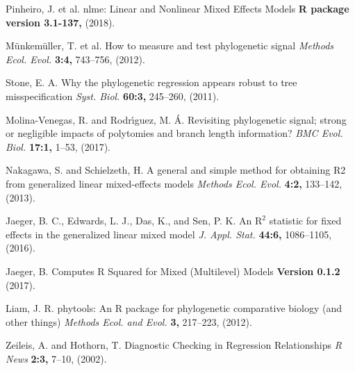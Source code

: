 \documentclass[twocolumn, linenumbers, superscriptaddress, nofootinbib]{revtex4-1}
\begin{document}
\begin{thebibliography}{50}
				Pinheiro, J. et al.
				nlme: Linear and Nonlinear Mixed Effects Models
				\textbf{R package version 3.1-137,}
				(2018).
			
				M{\"u}nkem{\"u}ller, T. et al.
				How to measure and test phylogenetic signal
				\textit{Methods Ecol. Evol.}
				\textbf{3:4,}
				743--756,
				(2012).
			
				Stone, E. A.
				Why the phylogenetic regression appears robust to tree misspecification
				\textit{Syst. Biol.}
				\textbf{60:3,}
				245--260,
				(2011).
			
				Molina-Venegas, R. and Rodr{\'\i}guez, M. {\'A}.
				Revisiting phylogenetic signal; strong or negligible impacts of polytomies and branch length information?
				\textit{BMC Evol. Biol.}
				\textbf{17:1,}
				1--53,
				(2017).			
			
				Nakagawa, S. and Schielzeth, H.
				A general and simple method for obtaining R2 from generalized linear mixed-effects models
				\textit{Methods Ecol. Evol.}
				\textbf{4:2,}
				133--142,
				(2013).
		
				Jaeger, B. C., Edwards, L. J., Das, K., and Sen, P. K.
				An $\text{R}^2$ statistic for fixed effects in the generalized linear mixed model
				\textit{J. Appl. Stat.}
				\textbf{44:6,}
				1086--1105,
				(2016).
			
				Jaeger, B.
				Computes R Squared for Mixed (Multilevel) Models
				\textbf{Version 0.1.2}
				(2017).
			
				Liam, J. R.
				phytools: An R package for phylogenetic comparative biology (and other things)
				\textit{Methods Ecol. and Evol.}
				\textbf{3,}
				217--223,
				(2012).
		
				Zeileis, A. and Hothorn, T.
				Diagnostic Checking in Regression Relationships
				\textit{R News}
				\textbf{2:3,}
				7--10,
				(2002).
	\end{thebibliography}
\end{document}
